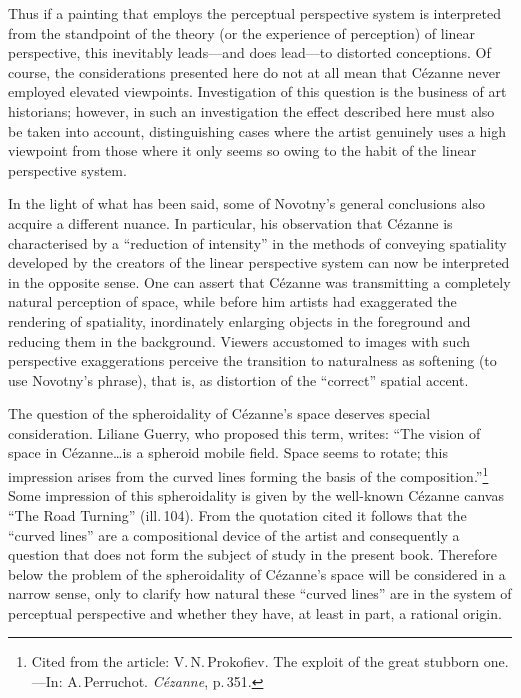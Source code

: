 Thus if a painting that employs the perceptual perspective system is interpreted from
the standpoint of the theory (or the experience of perception) of linear perspective,
this inevitably leads---and does lead---to distorted conceptions. Of course, the
considerations presented here do not at all mean that Cézanne never employed elevated
viewpoints. Investigation of this question is the business of art historians; however,
in such an investigation the effect described here must also be taken into account,
distinguishing cases where the artist genuinely uses a high viewpoint from those
where it only seems so owing to the habit of the linear perspective system.


In the light of what has been said, some of Novotny's general conclusions also
acquire a different nuance. In particular, his observation that Cézanne is
characterised by a ``reduction of intensity'' in the methods of conveying spatiality
developed by the creators of the linear perspective system can now be interpreted in
the opposite sense. One can assert that Cézanne was transmitting a completely
natural perception of space, while before him artists had exaggerated the rendering
of spatiality, inordinately enlarging objects in the foreground and reducing them in
the background. Viewers accustomed to images with such perspective exaggerations
perceive the transition to naturalness as softening (to use Novotny's phrase), that
is, as distortion of the ``correct'' spatial accent.

The question of the spheroidality of Cézanne's space deserves special consideration.
Liliane Guerry, who proposed this term, writes: ``The vision of space in
Cézanne\ldots is a spheroid mobile field. Space seems to rotate; this impression
arises from the curved lines forming the basis of the
composition.''\footnote{Cited from the article: V.\,N.\,Prokofiev. The exploit of
  the great stubborn one.---In: A.\,Perruchot. \emph{C\'ezanne}, p.\,351.}
Some impression of this spheroidality is given by the well-known Cézanne canvas
``The Road Turning'' (ill.\,104). From the quotation cited it follows that the
``curved lines'' are a compositional device of the artist and consequently a question
that does not form the subject of study in the present book. Therefore below the
problem of the spheroidality of Cézanne's space will be considered in a narrow sense,
only to clarify how natural these ``curved lines'' are in the system of perceptual
perspective and whether they have, at least in part, a rational origin.

